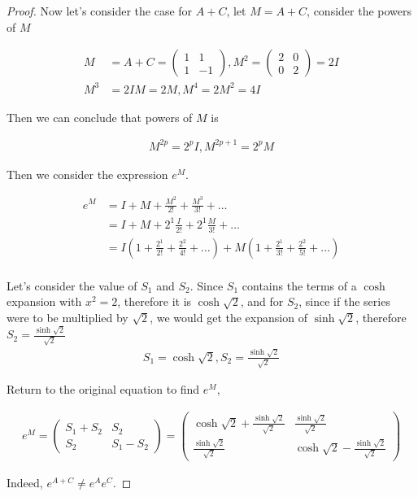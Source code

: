 \documentclass{article}
\begin{document}
\begin{proof}
Now let's consider the case for $A+C$, let $M = A+C$, consider the powers of $M$

\begin{align*}
M &= A+C = \begin{pmatrix}
1 & 1 \\ 1 & -1
\end{pmatrix}, 
M^2 = \begin{pmatrix}
2 & 0 \\ 0 & 2
\end{pmatrix}  = 2I \\
M^3 &= 2IM = 2M,
M^4 = 2M^2 = 4I 
\end{align*}

Then we can conclude that powers of $M$ is 

\begin{align*}
M^{2p} = 2^p I, 
M^{2p+1} = 2^p M
\end{align*}

Then we consider the expression $e^{M}$. 

\begin{align*}
e^{M} &= I + M + \frac{M^2}{2!} + \frac{M^3}{3!} + \ldots \\ 
&= I + M + 2^1 \frac{I}{2!} + 2^1 \frac{M}{3!} + \ldots \\
&= I(1 + \frac{2^1}{2!} + \frac{2^2}{4!} + \ldots ) + M (1 + \frac{2^1}{3!} + \frac{2^2}{5!} + \ldots ) \\
\end{align*}

Let's consider the value of $S_1$ and $S_2$. Since $S_1$ contains the terms of a $\cosh$ expansion with $x^2 = 2$, therefore it is $\cosh \sqrt{2}$, and for $S_2$, since if the series were to be multiplied by $\sqrt{2}$, we would get the expansion of $\sinh \sqrt{2}$, therefore $S_2 = \frac{\sinh \sqrt{2}}{\sqrt{2}}$
\begin{align*}
S_1 = \cosh \sqrt{2}, S_2 = \frac{\sinh \sqrt{2}}{\sqrt{2}}
\end{align*}

Return to the original equation to find $e^M$, 

\begin{align*}
e^M = \begin{pmatrix}
S_1 + S_2 & S_2 \\ S_2 & S_1 - S_2
\end{pmatrix}
= \begin{pmatrix}
\cosh \sqrt{2} + \frac{\sinh \sqrt{2}}{\sqrt{2}} & \frac{\sinh \sqrt{2}}{\sqrt{2}} \\ \frac{\sinh \sqrt{2}}{\sqrt{2}} & \cosh \sqrt{2} - \frac{\sinh \sqrt{2}}{\sqrt{2}}
\end{pmatrix}
\end{align*}

Indeed, $e^{A+C} \neq e^A e^C$.

\end{proof}
\end{document}
